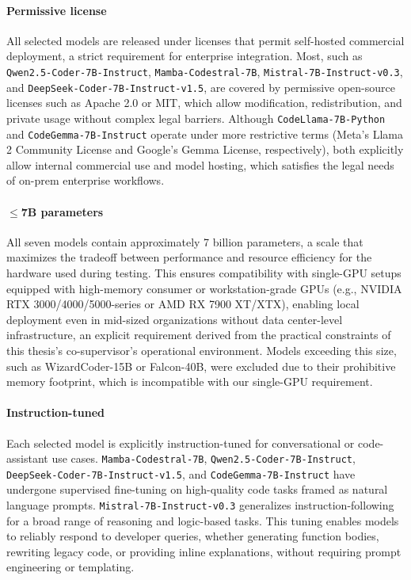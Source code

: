 \paragraph{Permissive license}
All selected models are released under licenses that permit self-hosted commercial deployment, a strict requirement for enterprise integration. Most, such as \texttt{Qwen2.5-Coder-7B-Instruct}, \texttt{Mamba-Codestral-7B}, \texttt{Mistral-7B-Instruct-v0.3}, and \texttt{DeepSeek-Coder-7B-Instruct-v1.5}, are covered by permissive open-source licenses such as Apache 2.0 or MIT, which allow modification, redistribution, and private usage without complex legal barriers. Although \texttt{CodeLlama-7B-Python} and \texttt{CodeGemma-7B-Instruct} operate under more restrictive terms (Meta’s Llama 2 Community License and Google’s Gemma License, respectively), both explicitly allow internal commercial use and model hosting, which satisfies the legal needs of on-prem enterprise workflows.

\paragraph{\(\leq\)7B parameters}
All seven models contain approximately 7 billion parameters, a scale that maximizes the tradeoff between performance and resource efficiency for the hardware used during testing. This ensures compatibility with single-GPU setups equipped with high-memory consumer or workstation-grade GPUs (e.g., NVIDIA RTX 3000/4000/5000-series or AMD RX 7900 XT/XTX), enabling local deployment even in mid-sized organizations without data center-level infrastructure, an explicit requirement derived from the practical constraints of this thesis's co-supervisor’s operational environment. Models exceeding this size, such as WizardCoder-15B or Falcon-40B, were excluded due to their prohibitive memory footprint, which is incompatible with our single-GPU requirement.

\paragraph{Instruction-tuned}
Each selected model is explicitly instruction-tuned for conversational or code-assistant use cases. \texttt{Mamba-Codestral-7B}, \texttt{Qwen2.5-Coder-7B-Instruct}, \texttt{DeepSeek-Coder-7B-Instruct-v1.5}, and \texttt{CodeGemma-7B-Instruct} have undergone supervised fine-tuning on high-quality code tasks framed as natural language prompts. \texttt{Mistral-7B-Instruct-v0.3} generalizes instruction-following for a broad range of reasoning and logic-based tasks. This tuning enables models to reliably respond to developer queries, whether generating function bodies, rewriting legacy code, or providing inline explanations, without requiring prompt engineering or templating.

